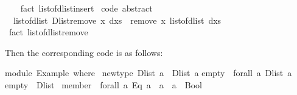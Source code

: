 \begin{isabellebody}
\ \ \isamarkupfalse%
\ {}fact\ list{}of{}dlist{}insert{}\isanewline
\isanewline
{}\isamarkupfalse%
\ {}code\ abstract{}{}\isanewline
\ \ {}list{}of{}dlist\ {}Dlist{}remove\ x\ dxs{}\ {}\ remove{}\ x\ {}list{}of{}dlist\ dxs{}{}\isanewline
\ \ \isamarkupfalse%
\ {}fact\ list{}of{}dlist{}remove{}%
\endisatagquote
{\isafoldquote}%
%
\isadelimquote
%
\endisadelimquote
%
\begin{isamarkuptext}%
\noindent Then the corresponding code is as follows:%
\end{isamarkuptext}%
\isamarkuptrue%
%
\isadelimquotetypewriter
%
\endisadelimquotetypewriter
%
\isatagquotetypewriter
%
\begin{isamarkuptext}%
module\ Example\ where\ {}\isanewline
\isanewline
newtype\ Dlist\ a\ {}\ Dlist\ {}a{}{}\isanewline
\isanewline
empty\ {}{}\ forall\ a{}\ Dlist\ a{}\isanewline
empty\ {}\ Dlist\ {}{}{}\isanewline
\isanewline
member\ {}{}\ forall\ a{}\ {}Eq\ a{}\ {}{}\ {}a{}\ {}{}\ a\ {}{}\ Bool{}\isanewline

\end{isamarkuptext}
\end{isabellebody}
